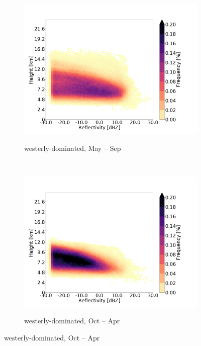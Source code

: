 \documentclass[alpha-refs]{wiley-article}
\begin{document}
\begin{figure}[!htbp]
    \begin{subfigure}[b]{0.5\textwidth}
       \centering
        \caption{westerly-dominated, May -- Sep}
        \includegraphics[width=\textwidth]{radar_reflect_westerlydomain_monsoonseason.png}
        \label{fig:CFAD5}
    \end{subfigure}%
    ~ 
    \begin{subfigure}[b]{0.5\textwidth}
        \centering
        \caption{westerly-dominated, Oct -- Apr}        
        \includegraphics[width=\textwidth]{radar_reflect_westerlydomain_westerlyseason.png}
        \label{fig:CFAD6}
    \end{subfigure}
    \label{fig:CFAD}
    \end{figure}
\end{document}
